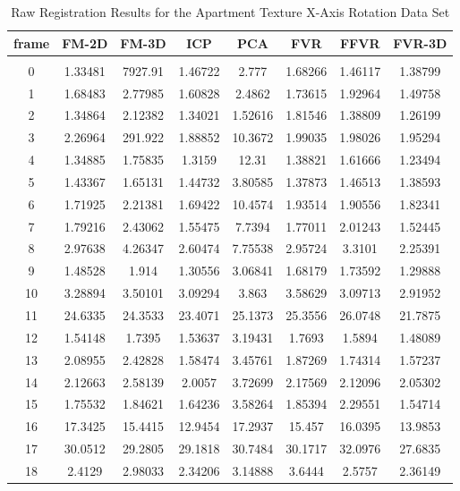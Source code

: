 \begin{center}
\begin{longtable}{cccccccc}
\caption{Raw Registration Results for the Apartment Texture X-Axis Rotation Data Set}
\label{tab:apartmenttexturex-axisrotationFULL}
\endfirsthead
\endhead
\textbf{frame} & \textbf{FM-2D} & \textbf{FM-3D} & \textbf{ICP} & \textbf{PCA} & \textbf{FVR} & \textbf{FFVR} & \textbf{FVR-3D} \\
\hline \\
0 & 1.33481 & 7927.91 & 1.46722 & 2.777 & 1.68266 & 1.46117 & 1.38799\\
1 & 1.68483 & 2.77985 & 1.60828 & 2.4862 & 1.73615 & 1.92964 & 1.49758\\
2 & 1.34864 & 2.12382 & 1.34021 & 1.52616 & 1.81546 & 1.38809 & 1.26199\\
3 & 2.26964 & 291.922 & 1.88852 & 10.3672 & 1.99035 & 1.98026 & 1.95294\\
4 & 1.34885 & 1.75835 & 1.3159 & 12.31 & 1.38821 & 1.61666 & 1.23494\\
5 & 1.43367 & 1.65131 & 1.44732 & 3.80585 & 1.37873 & 1.46513 & 1.38593\\
6 & 1.71925 & 2.21381 & 1.69422 & 10.4574 & 1.93514 & 1.90556 & 1.82341\\
7 & 1.79216 & 2.43062 & 1.55475 & 7.7394 & 1.77011 & 2.01243 & 1.52445\\
8 & 2.97638 & 4.26347 & 2.60474 & 7.75538 & 2.95724 & 3.3101 & 2.25391\\
9 & 1.48528 & 1.914 & 1.30556 & 3.06841 & 1.68179 & 1.73592 & 1.29888\\
10 & 3.28894 & 3.50101 & 3.09294 & 3.863 & 3.58629 & 3.09713 & 2.91952\\
11 & 24.6335 & 24.3533 & 23.4071 & 25.1373 & 25.3556 & 26.0748 & 21.7875\\
12 & 1.54148 & 1.7395 & 1.53637 & 3.19431 & 1.7693 & 1.5894 & 1.48089\\
13 & 2.08955 & 2.42828 & 1.58474 & 3.45761 & 1.87269 & 1.74314 & 1.57237\\
14 & 2.12663 & 2.58139 & 2.0057 & 3.72699 & 2.17569 & 2.12096 & 2.05302\\
15 & 1.75532 & 1.84621 & 1.64236 & 3.58264 & 1.85394 & 2.29551 & 1.54714\\
16 & 17.3425 & 15.4415 & 12.9454 & 17.2937 & 15.457 & 16.0395 & 13.9853\\
17 & 30.0512 & 29.2805 & 29.1818 & 30.7484 & 30.1717 & 32.0976 & 27.6835\\
18 & 2.4129 & 2.98033 & 2.34206 & 3.14888 & 3.6444 & 2.5757 & 2.36149\\

\end{longtable}
\end{center}
